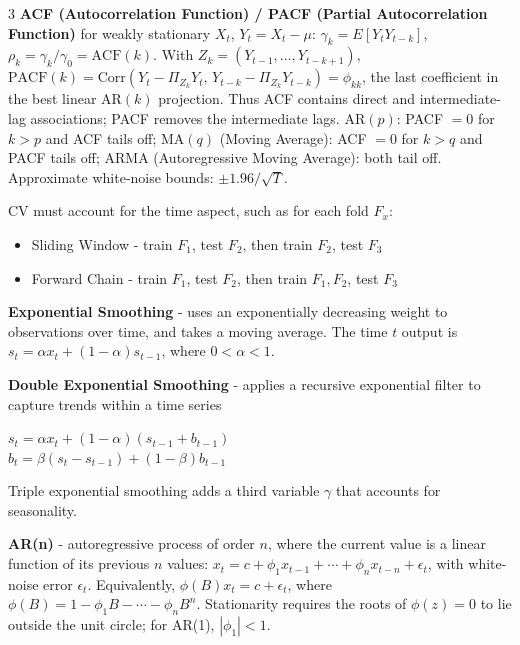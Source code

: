 \documentclass[10pt,landscape]{article}
\begin{document}
\begin{multicols}{3}
        \textbf{ACF (Autocorrelation Function) / PACF (Partial Autocorrelation Function)} for weakly stationary $X_t$, $Y_t=X_t-\mu$:
        $\gamma_k=E[Y_tY_{t-k}]$, $\rho_k=\gamma_k/\gamma_0=\mathrm{ACF}(k)$.
        With $Z_k=(Y_{t-1},\ldots,Y_{t-k+1})$, $\mathrm{PACF}(k)=\mathrm{Corr}(Y_t-\Pi_{Z_k}Y_t,\,Y_{t-k}-\Pi_{Z_k}Y_{t-k})=\phi_{kk}$, the last coefficient in the best linear AR$(k)$ projection. Thus ACF contains direct and intermediate-lag associations; PACF removes the intermediate lags. AR$(p)$: PACF $=0$ for $k>p$ and ACF tails off; MA$(q)$ (Moving Average): ACF $=0$ for $k>q$ and PACF tails off; ARMA (Autoregressive Moving Average): both tail off. Approximate white-noise bounds: $\pm1.96/\sqrt{T}$.


        CV must account for the time aspect, such as for each fold $F_x$:
        \begin{itemize}[label={--},leftmargin=4mm]
            \itemsep -.4mm
            \item Sliding Window - train $F_1$, test $F_2$, then train $F_2$, test $F_3$
            \item Forward Chain - train $F_1$, test $F_2$, then train $F_1, F_2$, test $F_3$
        \end{itemize}

        \textbf{Exponential Smoothing} - uses an exponentially decreasing weight to observations over time, and takes a moving average. The time $t$ output is $s_t = \alpha x_t + (1-\alpha)s_{t-1}$, where  $0 < \alpha < 1$.
        \smallskip

        \textbf{Double Exponential Smoothing} - applies a recursive exponential filter to capture trends within a time series
        \begin{center}
            \vspace{-2.5mm}
            $s_t = \alpha x_t + (1-\alpha)(s_{t-1} + b_{t-1})$\\
            $b_t = \beta (s_t - s_{t-1}) + (1-\beta)b_{t-1}$\\
            \vspace{-2mm}
        \end{center}
        Triple exponential smoothing adds a third variable
    $\gamma$ that accounts for seasonality.
        \smallskip

        \textbf{AR(n)} - autoregressive process of order $n$, where the current value is a linear function of its previous $n$ values:
        $\displaystyle x_t=c+\phi_1x_{t-1}+\cdots+\phi_nx_{t-n}+\epsilon_t$, with white-noise error $\epsilon_t$.
        Equivalently, $\displaystyle \phi(B)x_t=c+\epsilon_t$, where $\phi(B)=1-\phi_1B-\cdots-\phi_nB^n$. Stationarity requires the roots of $\phi(z)=0$ to lie outside the unit circle; for AR(1), $|\phi_1|<1$.
        \smallskip


\end{multicols}
\end{document}
